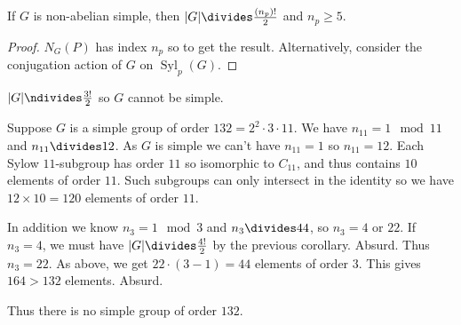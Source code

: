 \documentclass[a4paper]{article}
\theoremstyle{definition}
\DeclareMathOperator{\syl}{Syl}
\begin{document}
\begin{corollary}
  If \(G\) is non-abelian simple, then \(|G| \divides \frac{(n_p)!}{2}\) and \(n_p \geq 5\).
\end{corollary}

\begin{proof}
  \(N_G(P)\) has index \(n_p\) so  to get the result. Alternatively, consider the conjugation action of \(G\) on \(\syl_p(G)\).
\end{proof}

\begin{eg}[Continued]
  \(|G| \ndivides \frac{3!}{2}\) so \(G\) cannot be simple.
\end{eg}

\begin{eg}
  Suppose \(G\) is a simple group of order \(132 = 2^2 \cdot 3 \cdot 11\). We have \(n_{11} = 1 \mod 11\) and \(n_{11} \divides 12\). As \(G\) is simple we can't have \(n_{11} = 1\) so \(n_{11} = 12\). Each Sylow \(11\)-subgroup has order \(11\) so isomorphic to \(C_{11}\), and thus contains \(10\) elements of order \(11\). Such subgroups can only intersect in the identity so we have \(12 \times 10 = 120\) elements of order \(11\).

  In addition we know \(n_3 = 1 \mod 3\) and \(n_3 \divides 44\), so \(n_3 = 4\) or \(22\). If \(n_3 = 4\), we must have \(|G| \divides \frac{4!}{2}\) by the previous corollary. Absurd. Thus \(n_3 = 22\). As above, we get \(22 \cdot (3 - 1) = 44\) elements of order \(3\). This gives \(164 > 132\) elements. Absurd.

  Thus there is no simple group of order \(132\).
\end{eg}
\end{document}
